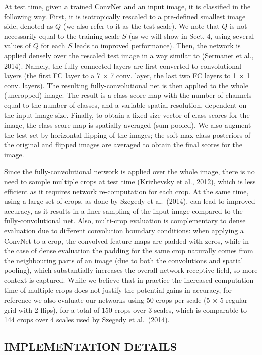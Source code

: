 \documentclass[12pt,a4paper,UTF8,twoside]{book}
\begin{document}
At test time, given a trained ConvNet and an input image, it is classified in the following way. First, it is isotropically rescaled to a pre-defined smallest image side, denoted as \(Q\) (we also refer to it as the test scale). We note that \(Q\) is not necessarily equal to the training scale \(S\) (as we will show in Sect. 4, using several values of \(Q\) for each \(S\) leads to improved performance). Then, the network is applied densely over the rescaled test image in a way similar to (Sermanet et al., 2014). Namely, the fully-connected layers are first converted to convolutional layers (the first FC layer to a 7 × 7 conv. layer, the last two FC layers to 1 × 1 conv. layers). The resulting fully-convolutional net is then applied to the whole (uncropped) image. The result is a class score map with the number of channels equal to the number of classes, and a variable spatial resolution, dependent on the input image size. Finally, to obtain a fixed-size vector of class scores for the image, the class score map is spatially averaged (sum-pooled). We also augment the test set by horizontal flipping of the images; the soft-max class posteriors of the original and flipped images are averaged to obtain the final scores for the image.

Since the fully-convolutional network is applied over the whole image, there is no need to sample multiple crops at test time (Krizhevsky et al., 2012), which is less efficient as it requires network re-computation for each crop. At the same time, using a large set of crops, as done by Szegedy et al.~(2014), can lead to improved accuracy, as it results in a finer sampling of the input image compared to the fully-convolutional net. Also, multi-crop evaluation is complementary to dense evaluation due to different convolution boundary conditions: when applying a ConvNet to a crop, the convolved feature maps are padded with zeros, while in the case of dense evaluation the padding for the same crop naturally comes from the neighbouring parts of an image (due to both the convolutions and spatial pooling), which substantially increases the overall network receptive field, so more context is captured. While we believe that in practice the increased computation time of multiple crops does not justify the potential gains in accuracy, for reference we also evaluate our networks using 50 crops per scale (5 × 5 regular grid with 2 flips), for a total of 150 crops over 3 scales, which is comparable to 144 crops over 4 scales used by Szegedy et al.~(2014).

\hypertarget{implementation-details}{%
\subsection{IMPLEMENTATION DETAILS}\label{implementation-details}}
\end{document}
